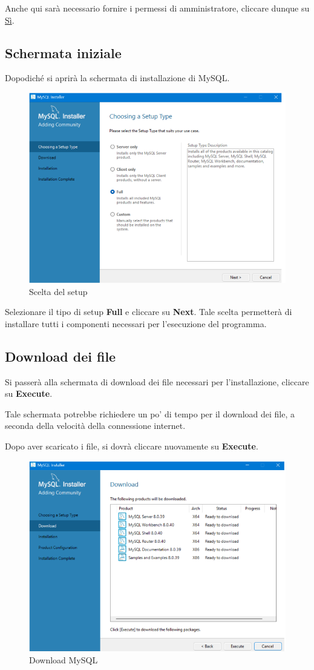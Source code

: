 Anche qui sarà necessario fornire i permessi di amministratore, cliccare dunque su \underline{Sì}.

\subsection{Schermata iniziale}

Dopodiché si aprirà la schermata di installazione di MySQL.

\begin{figure}[h!]
    \centering
    \includegraphics[width=.6\textwidth]{images/inizio mysql.png}
    \caption{Scelta del setup}
\end{figure}

Selezionare il tipo di setup \textbf{Full} e cliccare su \textbf{Next}. Tale scelta permetterà di installare tutti i componenti necessari per l'esecuzione del programma.

\subsection{Download dei file}

Si passerà alla schermata di download dei file necessari per l'installazione, cliccare su \textbf{Execute}. 

\begin{tcolorbox}[  colback=white!5!white, colframe=gray, title={Avvertenza} ]
    
    
    Tale schermata potrebbe richiedere un po' di tempo per il download dei file, a seconda della velocità della connessione internet. 
\end{tcolorbox}
    
Dopo aver scaricato i file, si dovrà cliccare nuovamente su \textbf{Execute}.

\begin{figure}[h!]
    \centering
    \includegraphics[width=.6\textwidth]{images/eexecute.png}
    \caption{Download MySQL}
\end{figure}

